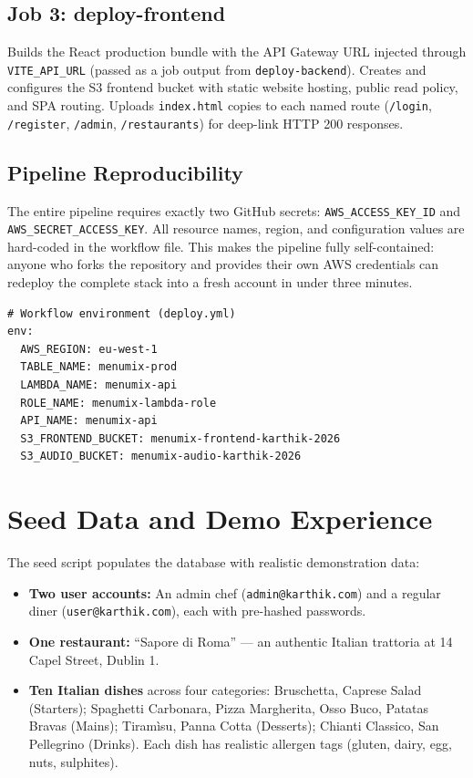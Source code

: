 \documentclass[conference]{IEEEtran}
\begin{document}
\subsection{Job 3: deploy-frontend}

Builds the React production bundle with the API Gateway URL injected through \texttt{VITE\_API\_URL} (passed as a job output from \texttt{deploy-backend}). Creates and configures the S3 frontend bucket with static website hosting, public read policy, and SPA routing. Uploads \texttt{index.html} copies to each named route (\texttt{/login}, \texttt{/register}, \texttt{/admin}, \texttt{/restaurants}) for deep-link HTTP 200 responses.

\subsection{Pipeline Reproducibility}

The entire pipeline requires exactly two GitHub secrets: \texttt{AWS\_ACCESS\_KEY\_ID} and \texttt{AWS\_SECRET\_ACCESS\_KEY}. All resource names, region, and configuration values are hard-coded in the workflow file. This makes the pipeline fully self-contained: anyone who forks the repository and provides their own AWS credentials can redeploy the complete stack into a fresh account in under three minutes.

\begin{lstlisting}[style=yamlcode]
# Workflow environment (deploy.yml)
env:
  AWS_REGION: eu-west-1
  TABLE_NAME: menumix-prod
  LAMBDA_NAME: menumix-api
  ROLE_NAME: menumix-lambda-role
  API_NAME: menumix-api
  S3_FRONTEND_BUCKET: menumix-frontend-karthik-2026
  S3_AUDIO_BUCKET: menumix-audio-karthik-2026
\end{lstlisting}

\section{Seed Data and Demo Experience}

The seed script populates the database with realistic demonstration data:

\begin{itemize}[leftmargin=*]
    \item \textbf{Two user accounts:} An admin chef (\texttt{admin@karthik.com}) and a regular diner (\texttt{user@karthik.com}), each with pre-hashed passwords.
    \item \textbf{One restaurant:} ``Sapore di Roma'' --- an authentic Italian trattoria at 14 Capel Street, Dublin 1.
    \item \textbf{Ten Italian dishes} across four categories: Bruschetta, Caprese Salad (Starters); Spaghetti Carbonara, Pizza Margherita, Osso Buco, Patatas Bravas (Mains); Tiram\`{i}su, Panna Cotta (Desserts); Chianti Classico, San Pellegrino (Drinks). Each dish has realistic allergen tags (gluten, dairy, egg, nuts, sulphites).
\end{itemize}
\end{document}
